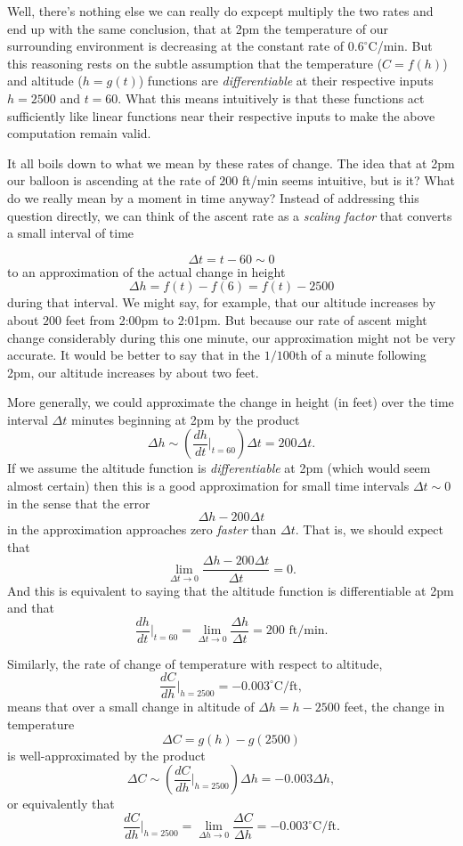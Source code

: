 \documentclass{ximera}
\begin{document}
Well, there's nothing else we can really do expcept multiply the two rates and end up with the same conclusion, that at 2pm the temperature of our surrounding environment is decreasing at the constant rate of $0.6^\circ$C/min. But this reasoning rests on the subtle assumption that the temperature ($C=f(h)$) and altitude ($h=g(t)$) functions are \emph{differentiable} at their respective inputs $h=2500$ and $t=60$. What this means intuitively is that these functions act sufficiently like linear functions near their respective inputs to make the above computation remain valid. 

It all boils down to what we mean by these rates of change. The idea that at 2pm our balloon is ascending at the rate of $200$ ft/min seems intuitive, but is it? What do we really mean by a moment in time anyway? Instead of addressing this question directly, we can  think of the ascent rate as a \emph{scaling factor} that converts a small interval of time  

\[
 \Delta t = t-60 \sim 0
\]
to an approximation of the actual change in height 
\[
  \Delta h = f(t) - f(6) = f(t) - 2500 
\]
during that interval. We might say, for example, that our altitude increases by about $200$ feet from 2:00pm to 2:01pm. But because our rate of ascent might change considerably during this one minute, our approximation might not be very accurate. It would be better to say that in the $1/100$th of a minute following 2pm, our altitude increases by about two feet. 

More generally, we could approximate the change in height (in feet) over the time interval $\Delta t$ minutes beginning at 2pm by the product
\[
         \Delta h \sim \left( \frac{dh}{dt}\Big|_{t=60}\right) \Delta t = 200 \Delta t.   
\]
If we assume the altitude function is \emph{differentiable} at 2pm (which would seem almost certain) then this is a good approximation for small time intervals $\Delta t \sim 0$ in the sense that the error
\[
      \Delta h - 200 \Delta t
\]
in the approximation approaches zero \emph{faster} than $\Delta t$. That is, we should expect that
\[
   \lim_{\Delta t \to 0} \frac{ \Delta h - 200 \Delta t}{\Delta t} = 0.
\]
And this is equivalent to saying that the altitude function is differentiable at 2pm and that
\[
    \frac{dh}{dt}\Big|_{t=60} =  \lim_{\Delta t \to 0} \frac{ \Delta h}{\Delta t} = 200 \text{ ft/min}.
\]

Similarly, the rate of change of temperature with respect to altitude,
\[
  \frac{dC}{dh}\Big|_{h=2500} = -0.003^\circ \text{C/ft} ,
\]
means that over a small change in altitude of $\Delta h = h - 2500$ feet, the change in temperature
\[
         \Delta C = g(h) - g(2500)
\]
is well-approximated by the product
\[
       \Delta C \sim \left( \frac{dC}{dh}\Big|_{h=2500}\right) \Delta h = -0.003 \Delta h ,  
\]
or equivalently that
\[
    \frac{dC}{dh}\Big|_{h=2500} = \lim_{\Delta h\to 0} \frac{\Delta C}{\Delta h} = -0.003^\circ \text{C/ft}.
\]
\end{document}
